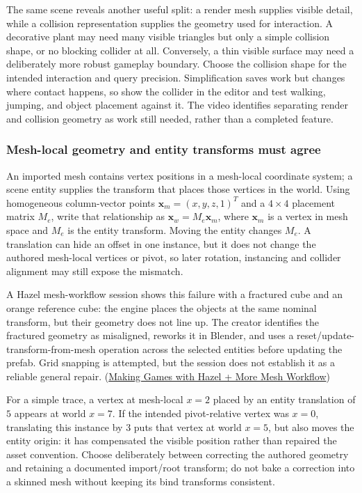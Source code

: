 The same scene reveals another useful split: a render mesh supplies visible detail, while a collision representation supplies the geometry used for interaction. A decorative plant may need many visible triangles but only a simple collision shape, or no blocking collider at all. Conversely, a thin visible surface may need a deliberately more robust gameplay boundary. Choose the collision shape for the intended interaction and query precision. Simplification saves work but changes where contact happens, so show the collider in the editor and test walking, jumping, and object placement against it. The video identifies separating render and collision geometry as work still needed, rather than a completed feature.

\subsubsection{Mesh-local geometry and entity transforms must agree}\label{06-engine-ii-ch032-mesh-local-geometry-and-entity-transforms-must-agree}

\hypertarget{06-engine-ii-ch032-mesh-local-geometry-and-entity-transforms-must-agree}{}

An imported mesh contains vertex positions in a mesh-local coordinate system; a scene entity supplies the transform that places those vertices in the world. Using homogeneous column-vector points \(\mathbf{x}_m=(x,y,z,1)^T\) and a \(4\times4\) placement matrix \(M_e\), write that relationship as \(\mathbf{x}_w = M_e\mathbf{x}_m\), where \(\mathbf{x}_m\) is a vertex in mesh space and \(M_e\) is the entity transform. Moving the entity changes \(M_e\). A translation can hide an offset in one instance, but it does not change the authored mesh-local vertices or pivot, so later rotation, instancing and collider alignment may still expose the mismatch.

A Hazel mesh-workflow session shows this failure with a fractured cube and an orange reference cube: the engine places the objects at the same nominal transform, but their geometry does not line up. The creator identifies the fractured geometry as misaligned, reworks it in Blender, and uses a reset/update-transform-from-mesh operation across the selected entities before updating the prefab. Grid snapping is attempted, but the session does not establish it as a reliable general repair. (\href{https://www.youtube.com/watch?v=GjqDjvNssOM}{Making Games with Hazel + More Mesh Workflow})

For a simple trace, a vertex at mesh-local \(x=2\) placed by an entity translation of \(5\) appears at world \(x=7\). If the intended pivot-relative vertex was \(x=0\), translating this instance by \(3\) puts that vertex at world \(x=5\), but also moves the entity origin: it has compensated the visible position rather than repaired the asset convention. Choose deliberately between correcting the authored geometry and retaining a documented import/root transform; do not bake a correction into a skinned mesh without keeping its bind transforms consistent.

